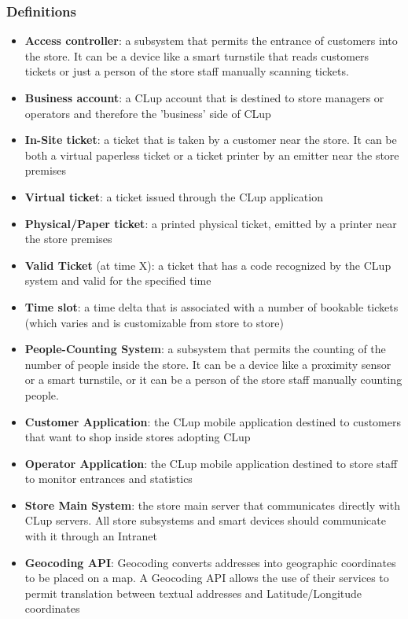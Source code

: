 \vfill
\pagebreak

\subsubsection{Definitions}
\begin{itemize}
      \item \textbf{Access controller}: a subsystem that permits the entrance of customers into the store. It can be a device like a smart turnstile that reads customers tickets or just a person of the store staff manually scanning tickets.
      \item \textbf{Business account}: a CLup account that is destined to store managers or operators and therefore the 'business' side of CLup
      \item \textbf{In-Site ticket}: a ticket that is taken by a customer near the store. It can be both a virtual paperless ticket or a ticket printer by an emitter near the store premises
      \item \textbf{Virtual ticket}: a ticket issued through the CLup application
      \item \textbf{Physical/Paper ticket}: a printed physical ticket, emitted by a printer near the store premises
      \item \textbf{Valid Ticket} (at time X): a ticket that has a code recognized by the CLup system and valid for the specified time
      \item \textbf{Time slot}: a time delta that is associated with a number of bookable tickets (which varies and is customizable from store to store)
      \item \textbf{People-Counting System}: a subsystem that permits the counting of the number of people inside the store. It can be a device like a proximity sensor or a smart turnstile, or it can be a person of the store staff manually counting people.
      \item \textbf{Customer Application}: the CLup mobile application destined to customers that want to shop inside stores adopting CLup
      \item \textbf{Operator Application}: the CLup mobile application destined to store staff to monitor entrances and statistics
      \item \textbf{Store Main System}: the store main server that communicates directly with CLup servers. All store subsystems and smart devices should communicate with it through an Intranet
      \item \textbf{Geocoding API}: Geocoding converts addresses into geographic coordinates to be placed on a map. A Geocoding API allows the use of their services to permit translation between textual addresses and Latitude/Longitude coordinates

\end{itemize}
